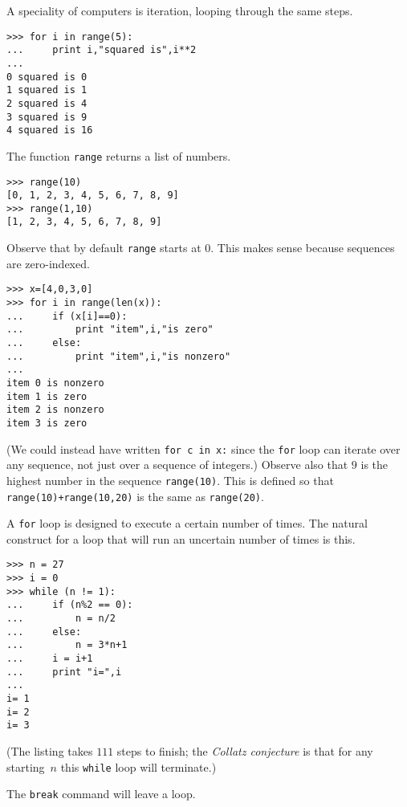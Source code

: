A speciality of computers is iteration, looping through the same steps.
\begin{lstlisting}[style=python]
>>> for i in range(5):
...     print i,"squared is",i**2
... 
0 squared is 0
1 squared is 1
2 squared is 4
3 squared is 9
4 squared is 16
\end{lstlisting}
The function \lstinline[style=inline]!range! returns a list of numbers.
\begin{lstlisting}[style=python]
 >>> range(10)
[0, 1, 2, 3, 4, 5, 6, 7, 8, 9]
>>> range(1,10)
[1, 2, 3, 4, 5, 6, 7, 8, 9] 
\end{lstlisting}
Observe that by default \lstinline[style=inline]!range! starts at $0$.
This makes sense because sequences are zero-indexed.
\begin{lstlisting}[style=python]
>>> x=[4,0,3,0]
>>> for i in range(len(x)):
...     if (x[i]==0):
...         print "item",i,"is zero"
...     else:
...         print "item",i,"is nonzero"
... 
item 0 is nonzero
item 1 is zero
item 2 is nonzero
item 3 is zero  
\end{lstlisting}
(We could instead have written \lstinline[style=inline]!for c in x:! since
the \lstinline[style=inline]!for! loop can iterate over any sequence, not just
over a sequence of integers.) 
Observe also that $9$ is the highest number in the sequence 
\lstinline[style=inline]!range(10)!.
This is defined so that \lstinline[style=inline]!range(10)+range(10,20)! is the
same as \lstinline[style=inline]!range(20)!.

A \lstinline[style=inline]!for! loop is designed to execute a certain
number of times.
The natural construct for a loop that will run an uncertain number of times
is this.
\begin{lstlisting}[style=python]
>>> n = 27
>>> i = 0
>>> while (n != 1):
...     if (n%2 == 0):
...         n = n/2
...     else:
...         n = 3*n+1
...     i = i+1
...     print "i=",i
... 
i= 1
i= 2
i= 3  
\end{lstlisting}
(The listing takes $111$ steps to finish; the \textit{Collatz conjecture} is 
that for any starting~$n$ this \lstinline[style=inline]!while! loop will 
terminate.)

The \lstinline[style=inline]!break! command will leave a loop.




